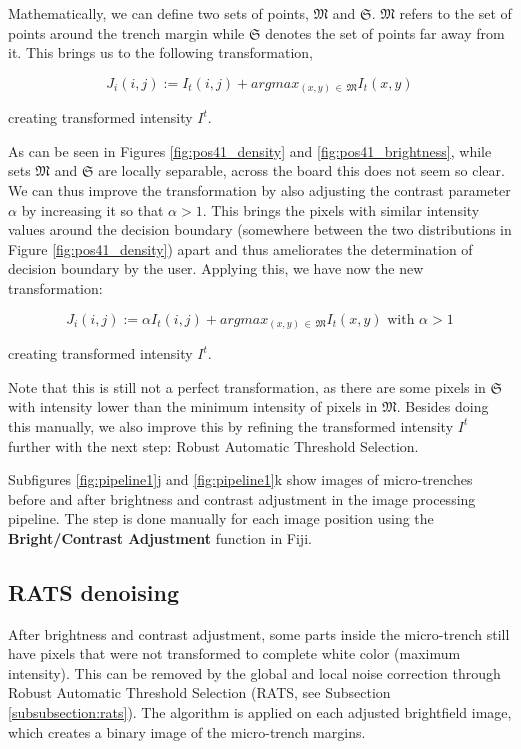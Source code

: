 \documentclass[pdftex,12pt,a4paper]{report}
\begin{document}
Mathematically, we can define two sets of points, $\mathfrak{M}$ and $\mathfrak{S}$. $\mathfrak{M}$ refers to the set of points around the trench margin while $\mathfrak{S}$ denotes the set of points far away from it. This brings us to the following transformation,

$$
J_i(i, j) := I_t(i, j) + argmax_{(x, y) \, \in \, \mathfrak{M}}{I_t(x, y)}
$$

creating transformed intensity $I^t$.

As can be seen in Figures \ref{fig:pos41_density} and \ref {fig:pos41_brightness}, while sets $\mathfrak{M}$ and $\mathfrak{S}$ are locally separable, across the board this does not seem so clear. We can thus improve the transformation by also adjusting the contrast parameter $\alpha$ by increasing it so that $\alpha > 1$. This brings the pixels with similar intensity values around the decision boundary (somewhere between the two distributions in Figure \ref{fig:pos41_density}) apart and thus ameliorates the determination of decision boundary by the user. Applying this, we have now the new transformation:

$$
J_i(i, j) := \alpha I_t(i, j) + argmax_{(x, y) \, \in \, \mathfrak{M}}{I_t(x, y)} \text{ with } \alpha > 1
$$

creating transformed intensity $I^t$.

Note that this is still not a perfect transformation, as there are some pixels in $\mathfrak{S}$ with intensity lower than the minimum intensity of pixels in $\mathfrak{M}$. Besides doing this manually, we also improve this by refining the transformed intensity $I^t$ further with the next step: Robust Automatic Threshold Selection.

Subfigures \ref{fig:pipeline1}j and \ref{fig:pipeline1}k show images of micro-trenches before and after brightness and contrast adjustment in the image processing pipeline.  The step is done manually for each image position using the \textbf{Bright/Contrast Adjustment} function in Fiji.

\subsection{RATS denoising}
\label{subsubsection:rats_denoising}

After brightness and contrast adjustment, some parts inside the micro-trench still have pixels  that were not transformed to complete white color (maximum intensity). This can be removed by the global and local noise correction through Robust Automatic Threshold Selection (RATS, see Subsection \ref{subsubsection:rats}). The algorithm is applied on each adjusted brightfield image, which creates a binary image of the micro-trench margins.
\end{document}
